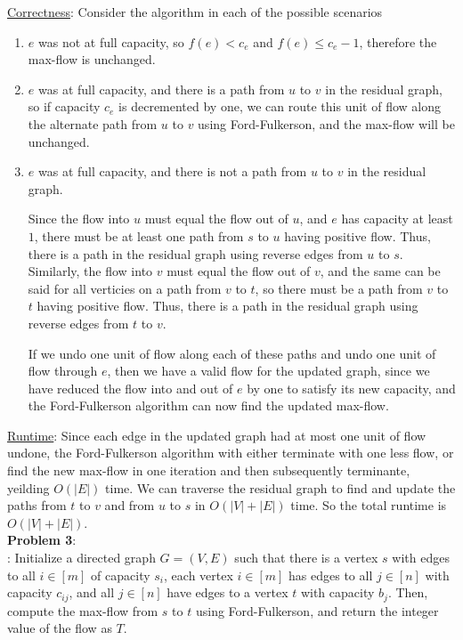 \documentclass{article}
\begin{document}
\underline{Correctness}: Consider the algorithm in each of the possible scenarios
\begin{enumerate}
    \item $e$ was not at full capacity, so $f(e) < c_e$ and $f(e) \leq c_e - 1$, therefore the max-flow is unchanged.
    \item $e$ was at full capacity, and there is a path from $u$ to $v$ in the residual graph, so if capacity $c_e$ is decremented by one, we can route this unit of flow along the alternate path from $u$ to $v$ using Ford-Fulkerson, and the max-flow will be unchanged.
    \item $e$ was at full capacity, and there is not a path from $u$ to $v$ in the residual graph. 
    
    Since the flow into $u$ must equal the flow out of $u$, and $e$ has capacity at least $1$, there must be at least one path from $s$ to $u$ having positive flow. Thus, there is a path in the residual graph using reverse edges from $u$ to $s$. Similarly, the flow into $v$ must equal the flow out of $v$, and the same can be said for all verticies on a path from $v$ to $t$, so there must be a path from $v$ to $t$ having positive flow. Thus, there is a path in the residual graph using reverse edges from $t$ to $v$. 
    
    If we undo one unit of flow along each of these paths and undo one unit of flow through $e$, then we have a valid flow for the updated graph, since we have reduced the flow into and out of $e$ by one to satisfy its new capacity, and the Ford-Fulkerson algorithm can now find the updated max-flow.
\end{enumerate}
\underline{Runtime}: Since each edge in the updated graph had at most one unit of flow undone, the Ford-Fulkerson algorithm with either terminate with one less flow, or find the new max-flow in one iteration and then subsequently terminante, yeilding $O(|E|)$ time. We can traverse the residual graph to find and update the paths from $t$ to $v$ and from $u$ to $s$ in $O(|V| + |E|)$ time. So the total runtime is $O(|V| + |E|)$. \\[1.0ex]
\textbf{Problem 3}: \\[0.75ex]
: Initialize a directed graph $G = (V, E)$ such that there is a vertex $s$ with edges to all $i \in [m]$ of capacity $s_i$, each vertex $i \in [m]$ has edges to all $j \in [n]$ with capacity $c_{ij}$, and all $j \in [n]$ have edges to a vertex $t$ with capacity $b_j$. Then, compute the max-flow from $s$ to $t$ using Ford-Fulkerson, and return the integer value of the flow as $T$. \\[0.5ex]
\end{document}
